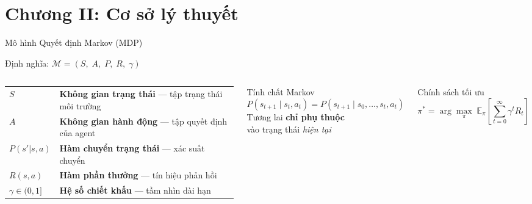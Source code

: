 \section{Chương II: Cơ sở lý thuyết}

\begin{frame}{Mô hình Quyết định Markov (MDP)}
  \begin{block}{Định nghĩa: $\mathcal{M} = (S,\; A,\; P,\; R,\; \gamma)$}
  \end{block}
  \vspace{4pt}
  \begin{columns}[T]
    \begin{tabular}{@{}lp{5.5cm}}
      $S$ & \textbf{Không gian trạng thái} --- tập trạng thái môi trường \\[4pt]
      $A$ & \textbf{Không gian hành động} --- tập quyết định của agent \\[4pt]
      $P(s'|s,a)$ & \textbf{Hàm chuyển trạng thái} --- xác suất chuyển \\[4pt]
      $R(s,a)$ & \textbf{Hàm phần thưởng} --- tín hiệu phản hồi \\[4pt]
      $\gamma\in(0,1]$ & \textbf{Hệ số chiết khấu} --- tầm nhìn dài hạn \\
    \end{tabular}

    \begin{alertblock}{Tính chất Markov}
      \[P(s_{t+1}\mid s_t, a_t) = P(s_{t+1}\mid s_0,\ldots,s_t,a_t)\]
      \centering Tương lai \textbf{chỉ phụ thuộc}\\vào trạng thái \textit{hiện tại}
    \end{alertblock}
    \vspace{6pt}
    \begin{block}{Chính sách tối ưu}
      \[\pi^* = \arg\max_\pi\; \mathbb{E}_\pi\!\left[\sum_{t=0}^{\infty}\gamma^t R_t\right]\]
    \end{block}
  \end{columns}
\end{frame}

